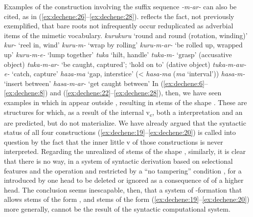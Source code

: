 \documentclass[output=paper,
modfonts
]{LSP/langsci}
\begin{document}
Examples of the construction  involving the suffix sequence
\textit{-m-ar-} can also be cited, as in (\ref{ex:dechene:26}--\ref{ex:dechene:28}).  reflects the
fact, not previously exemplified, that bare roots not infrequently occur
reduplicated as adverbial items of the mimetic vocabulary.
\ea \label{ex:dechene:26}
	 \ea \label{ex:dechene:26a} \textit{kurukuru} `round and round (rotation, winding)'
	 \ex \label{ex:dechene:26b} \textit{kur-} `reel in, wind'
	 \ex \label{ex:dechene:26c} \textit{kuru-m-} `wrap by rolling'
	 \ex \label{ex:dechene:26d} \textit{kuru-m-ar-} `be rolled up, wrapped up'
	 \ex \label{ex:dechene:26e} \textit{kuru-m-e-} `lump together'
	\z
\ex \label{ex:dechene:27} 
	 \ea \label{ex:dechene:27a} \textit{tuka} `hilt, handle'
	 \ex \label{ex:dechene:27b} \textit{tuka-m-} `grasp' (accusative object)
	 \ex \label{ex:dechene:27c} \textit{tuka-m-ar-} `be caught, captured'; `hold on to' (dative object)
	 \ex \label{ex:dechene:27d} \textit{tuka-m-aw-e-} `catch, capture'
	\z
\ex \label{ex:dechene:28}
	 \ea \label{ex:dechene:28a} \textit{haza-ma} `gap, interstice' (\textless{} \textit{hasa-ma} (\textit{ma} `interval'))
	 \ex \label{ex:dechene:28b} \textit{hasa-m-} `insert between'
	 \ex \label{ex:dechene:28c} \textit{hasa-m-ar-} `get caught between'
	\z
\z
In (\ref{ex:dechene:6}--\ref{ex:dechene:8}) and (\ref{ex:dechene:22}--\ref{ex:dechene:28}), then, we have seen examples in which
in appear outside ,
resulting in stems of the shape . These are structures for which,
as a result of the internal v\textsubscript{c}, both a 
interpretation and an  are predicted, but do not
materialize. We have already argued that the syntactic status of all
four constructions (\ref{ex:dechene:19}--\ref{ex:dechene:20}) is called into question by the fact that
the inner little v of those constructions is never interpreted.
Regarding the unrealized  of stems of the shape ,
similarly, it is clear that there is no way, in a system of syntactic
derivation based on selectional features and the  operation and
restricted by a ``no tampering'' condition \citep[138]{chomsky2008a}, for a
 introduced by one head to be deleted or ignored as a
consequence of  of a higher head. The conclusion seems
inescapable, then, that a system of -formation that allows stems of
the form , and stems of the form (\ref{ex:dechene:19}--\ref{ex:dechene:20}) more generally, cannot
be the result of the syntactic computational system.
\end{document}
